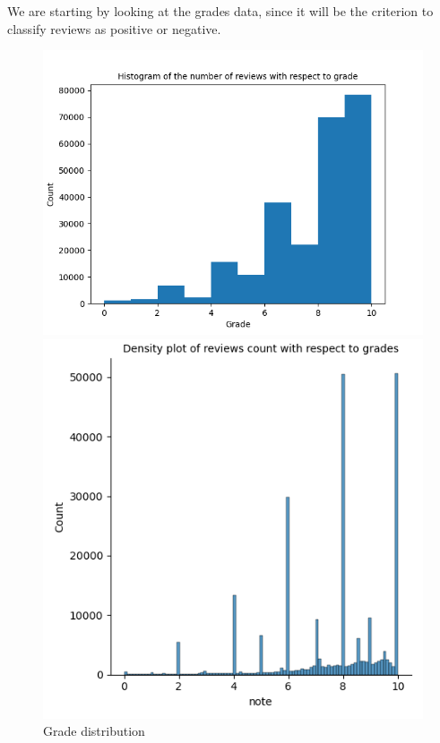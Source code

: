 \documentclass{article}
\begin{document}
We are starting by looking at the grades data, since it will be the criterion to classify reviews as positive or negative.
\begin{figure}[H]
  \centering
  \begin{minipage}[t]{0.49\linewidth}
    \centering
    \includegraphics[width=\linewidth]{hist_plot_count.png}
  \end{minipage}\hfill
  \begin{minipage}[t]{0.49\linewidth}
    \centering
    \includegraphics[width=\linewidth]{dist_plot_count.png}
  \end{minipage}
  \caption{Grade distribution}
  \label{fig:grades_distribution}
\end{figure}
\end{document}
